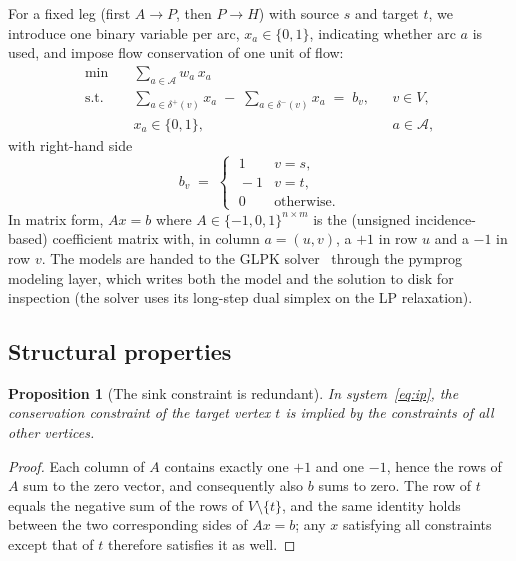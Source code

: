 \documentclass[10pt,twocolumn]{article}
\newtheorem{proposition}{Proposition}
\begin{document}
For a fixed leg (first $A\to P$, then $P\to H$) with source $s$ and target $t$, we introduce
one binary variable per arc, $x_a\in\{0,1\}$, indicating whether arc $a$ is used, and impose
flow conservation of one unit of flow:
\begin{equation}
\label{eq:ip}
\begin{aligned}
  \min \quad & \sum_{a\in\mathcal{A}} w_a\, x_a \\
  \text{s.t.}\quad
    & \sum_{a\in\delta^{+}(v)} x_a \;-\; \sum_{a\in\delta^{-}(v)} x_a \;=\; b_v,
      && v\in V, \\
    & x_a \in \{0,1\}, && a\in\mathcal{A},
\end{aligned}
\end{equation}
with right-hand side
\[
  b_v \;=\;
  \begin{cases}
    \;1 & v = s,\\
    \;-1 & v = t,\\
    \;0 & \text{otherwise}.
  \end{cases}
\]
In matrix form, $Ax=b$ where $A\in\{-1,0,1\}^{n\times m}$ is the (unsigned incidence-based)
coefficient matrix with, in column $a=(u,v)$, a $+1$ in row $u$ and a $-1$ in row $v$. The
models are handed to the GLPK solver~\cite{glpk} through the \textsf{pymprog} modeling
layer, which writes both the model and the solution to disk for inspection (the solver uses
its long-step dual simplex on the LP relaxation).

\subsection{Structural properties}

\begin{proposition}[The sink constraint is redundant]
\label{prop:sink}
In system~\eqref{eq:ip}, the conservation constraint of the target vertex $t$ is implied by
the constraints of all other vertices.
\end{proposition}
\begin{proof}
Each column of $A$ contains exactly one $+1$ and one $-1$, hence the rows of $A$ sum to the
zero vector, and consequently also $b$ sums to zero. The row of $t$ equals the negative sum
of the rows of $V\setminus\{t\}$, and the same identity holds between the two corresponding
sides of $Ax=b$; any $x$ satisfying all constraints except that of $t$ therefore satisfies
it as well.
\end{proof}
\end{document}
